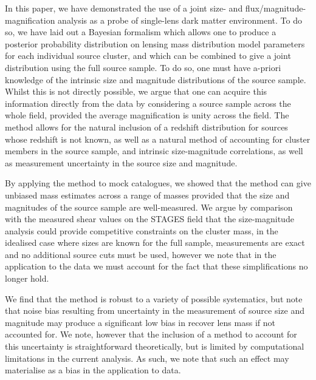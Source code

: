 \documentclass[useAMS,usenatbib,times,letter,amssymb]{mn2e}
\begin{document}
In this paper, we have demonstrated the use of a joint size- and flux/magnitude- magnification analysis as a probe of single-lens dark matter environment. To do so, we have laid out a Bayesian formalism which allows one to produce a posterior probability distribution on lensing mass distribution model parameters for each individual source cluster, and which can be combined to give a joint distribution using the full source sample. To do so, one must have a-priori knowledge of the intrinsic size and magnitude distributions of the source sample. Whilst this is not directly possible, we argue that one can acquire this information directly from the data by considering a source sample across the whole field, provided the average magnification is unity across the field. The method allows for the natural inclusion of a redshift distribution for sources whose redshift is not known, as well as a natural method of accounting for cluster members in the source sample, and intrinsic size-magnitude correlations, as well as measurement uncertainty in the source size and magnitude.

By applying the method to mock catalogues, we showed that the method can give unbiased mass estimates across a range of masses provided that the size and magnitudes of the source sample are well-measured. We argue by comparison with the measured shear values on the STAGES field that the size-magnitude analysis could provide competitive constraints on the cluster mass, in the idealised case where sizes are known for the full sample, measurements are exact and no additional source cuts must be used, however we note that in the application to the data we must account for the fact that these simplifications no longer hold.

We find that the method is robust to a variety of possible systematics, but note that noise bias resulting from uncertainty in the measurement of source size and magnitude may produce a significant low bias in recover lens mass if not accounted for. We note, however that the inclusion of a method to account for this uncertainty is straightforward theoretically, but is limited by computational limitations in the current analysis. As such, we note that such an effect may materialise as a bias in the application to data.
\end{document}
